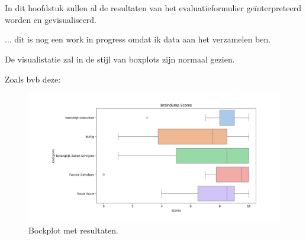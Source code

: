 \chapter{}%
\label{ch:resultaten}

In dit hoofdstuk zullen al de resultaten van het evaluatieformulier geïnterpreteerd worden en gevisualiseerd.

... dit is nog een work in progress omdat ik data aan het verzamelen ben.

De visualistatie zal in de stijl van boxplots zijn normaal gezien.

Zoals bvb deze:


\begin{figure}[h]
    \centering
    \includegraphics[width=\textwidth]{graphics/data/boxplot_test.png} 
    \caption{Bockplot met resultaten.}
    \label{fig:boxplot_braindump}
\end{figure}

